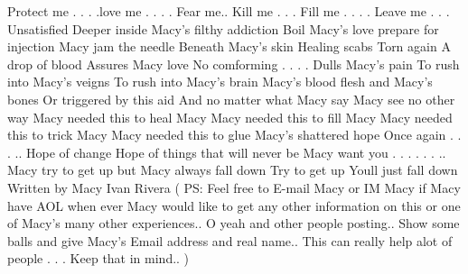 \documentclass[12pt]{book}
\begin{document}
Protect me . . .  .love me . . .  . Fear me.. Kill me . . .  Fill me . . .  . Leave me . . .  Unsatisfied Deeper inside Macy's filthy addiction Boil Macy's love prepare for injection Macy jam the needle Beneath Macy's skin Healing scabs Torn again A drop of blood Assures Macy love No comforming . . .  . Dulls Macy's pain To rush into Macy's veigns To rush into Macy's brain Macy's blood flesh and Macy's bones Or triggered by this aid And no matter what Macy say Macy see no other way Macy needed this to heal Macy Macy needed this to fill Macy Macy needed this to trick Macy Macy needed this to glue Macy's shattered hope Once again . . . .. Hope of change Hope of things that will never be Macy want you . . .   . . . .. Macy try to get up but Macy always fall down Try to get up Youll just fall down Written by Macy Ivan Rivera ( PS: Feel free to E-mail Macy or IM Macy if Macy have AOL when ever Macy would like to get any other information on this or one of Macy's many other experiences.. O yeah and other people posting.. Show some balls and give Macy's Email address and real name.. This can really help alot of people . . .  Keep that in mind.. )
\end{document}
